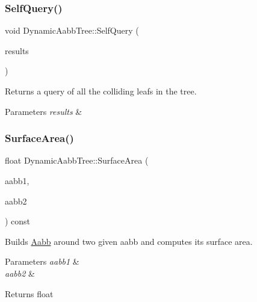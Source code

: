 \subsubsection{\texorpdfstring{Self\+Query()}{SelfQuery()}}
{\footnotesize\ttfamily void Dynamic\+Aabb\+Tree\+::\+Self\+Query (\begin{DoxyParamCaption}\item[{\hyperlink{classQueryResults}{Query\+Results} \&}]{results }\end{DoxyParamCaption})}



Returns a query of all the colliding leafs in the tree. 


\begin{DoxyParams}{Parameters}
{\em results} & \\
\hline
\end{DoxyParams}
\mbox{\label{classDynamicAabbTree_a6ba7bea87bd61579da6ee83f744cee00}} 
\subsubsection{\texorpdfstring{Surface\+Area()}{SurfaceArea()}}
{\footnotesize\ttfamily float Dynamic\+Aabb\+Tree\+::\+Surface\+Area (\begin{DoxyParamCaption}\item[{const \hyperlink{classAabb}{Aabb} \&}]{aabb1,  }\item[{const \hyperlink{classAabb}{Aabb} \&}]{aabb2 }\end{DoxyParamCaption}) const}



Builds \hyperlink{classAabb}{Aabb} around two given aabb and computes its surface area. 


\begin{DoxyParams}{Parameters}
{\em aabb1} & \\
\hline
{\em aabb2} & \\
\hline
\end{DoxyParams}
\begin{DoxyReturn}{Returns}
float 
\end{DoxyReturn}
\mbox{\label{classDynamicAabbTree_acacce0180628f79c049fde2af0c64a33}} 
